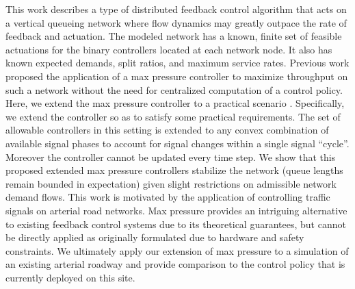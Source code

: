 This work describes a type of distributed feedback control algorithm that acts on a vertical queueing network where flow dynamics may greatly outpace the rate of feedback and actuation. The modeled network has a known, finite set of feasible actuations for the binary controllers located at each network node. It also has known expected demands, split ratios, and maximum service rates. Previous work proposed the application of a max pressure controller to maximize throughput on such a network without the need for centralized computation of a control policy. Here, we extend the max pressure controller to a practical scenario .
Specifically, we extend the controller so as to satisfy some practical requirements. The set of allowable controllers in this setting is extended to any convex combination of available signal phases to account for signal changes within a single signal ``cycle''. Moreover the controller cannot be updated every time step. We show that this proposed extended max pressure controllers stabilize the network (queue lengths remain bounded in expectation) given slight restrictions on admissible network demand flows.  
This work is motivated by the application of controlling traffic signals on arterial road networks. Max pressure provides an intriguing alternative to existing feedback control systems due to its theoretical guarantees, but cannot be directly applied as originally formulated due to hardware and safety constraints. We ultimately apply our extension of max pressure to a simulation of an existing arterial roadway and provide comparison to the control policy that is currently deployed on this site. 

